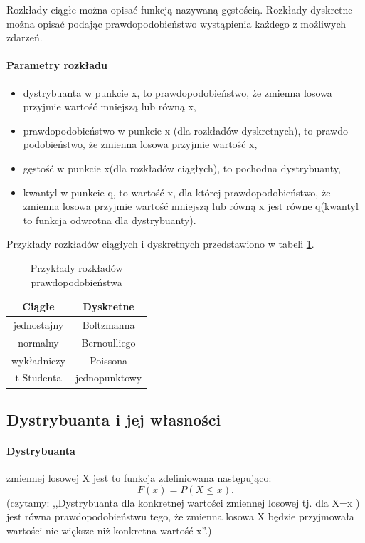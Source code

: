 \documentclass[a4paper,twoside]{report}
\begin{document}
Rozkłady ciągłe można opisać funkcją nazywaną gęstością. Rozkłady dyskretne można opisać podając prawdopodobieństwo wystąpienia każdego z możliwych zdarzeń. 

\paragraph{Parametry rozkładu}
\begin{itemize}
\item dystrybuanta w punkcie x, to prawdopodobieństwo, że zmienna losowa przyjmie wartość mniejszą lub równą x,
\item prawdopodobieństwo w punkcie x (dla rozkładów dyskretnych), to prawdo-podobieństwo, że zmienna losowa przyjmie wartość x,
\item gęstość w punkcie x(dla rozkładów ciągłych), to pochodna dystrybuanty,
\item kwantyl w punkcie q, to wartość x, dla której prawdopodobieństwo, że zmienna losowa przyjmie wartość mniejszą lub równą x jest równe q(kwantyl to funkcja odwrotna dla dystrybuanty).
\end{itemize}
Przykłady rozkładów ciągłych i dyskretnych przedstawiono w tabeli \ref{tab:przyklady_rozkladow}.

\begin{table}[h]
\centering
\caption{Przykłady rozkładów prawdopodobieństwa}
\label{tab:przyklady_rozkladow}
\begin{tabular}{|c|c|}
  \hline 
  \textbf{Ciągłe} & \textbf{Dyskretne}\\
  \hline
  jednostajny & Boltzmanna \\
  \hline
  normalny & Bernoulliego \\
  \hline
  wykładniczy & Poissona \\
  \hline
    t-Studenta & jednopunktowy \\
  \hline
\end{tabular} 
\end{table}

\subsection{Dystrybuanta i jej własności}
\paragraph{Dystrybuanta} zmiennej losowej X  jest to funkcja zdefiniowana następująco:
\begin{equation}
F(x) = P(X \le x).
\end{equation}
(czytamy: ,,Dystrybuanta dla konkretnej wartości zmiennej losowej tj. dla X=x ) jest równa prawdopodobieństwu tego, że zmienna losowa X będzie przyjmowała wartości nie większe niż konkretna wartość  x''.)
\end{document}
